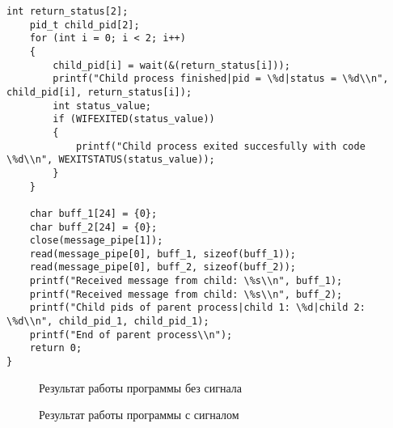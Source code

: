 \begin{lstlisting}[label=task_5,caption=Код к заданию №5]
    int return_status[2];
    pid_t child_pid[2];
    for (int i = 0; i < 2; i++)
    {
        child_pid[i] = wait(&(return_status[i]));
        printf("Child process finished|pid = \%d|status = \%d\\n", child_pid[i], return_status[i]);
        int status_value;
        if (WIFEXITED(status_value))
        {
            printf("Child process exited succesfully with code \%d\\n", WEXITSTATUS(status_value));
        }
    }

    char buff_1[24] = {0};
    char buff_2[24] = {0};
    close(message_pipe[1]);
    read(message_pipe[0], buff_1, sizeof(buff_1));
    read(message_pipe[0], buff_2, sizeof(buff_2));
    printf("Received message from child: \%s\\n", buff_1);
    printf("Received message from child: \%s\\n", buff_2);
    printf("Child pids of parent process|child 1: \%d|child 2: \%d\\n", child_pid_1, child_pid_1);
    printf("End of parent process\\n");
    return 0;
}
\end{lstlisting}

\begin{figure}[ph!]
	\caption{Результат работы программы без сигнала}
\end{figure}

\begin{figure}[ph!]
	\caption{Результат работы программы с сигналом}
\end{figure}
